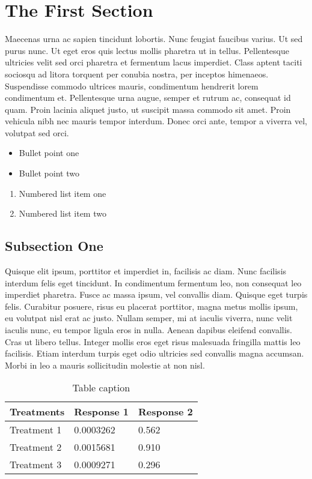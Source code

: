 \documentclass[preprint,12pt]{elsarticle}
\begin{document}
\linenumbers

\section{The First Section}
\label{S:1}

Maecenas urna ac sapien tincidunt lobortis. Nunc feugiat faucibus varius. Ut sed purus nunc. Ut eget eros quis lectus mollis pharetra ut in tellus. Pellentesque ultricies velit sed orci pharetra et fermentum lacus imperdiet. Class aptent taciti sociosqu ad litora torquent per conubia nostra, per inceptos himenaeos. Suspendisse commodo ultrices mauris, condimentum hendrerit lorem condimentum et. Pellentesque urna augue, semper et rutrum ac, consequat id quam. Proin lacinia aliquet justo, ut suscipit massa commodo sit amet. Proin vehicula nibh nec mauris tempor interdum. Donec orci ante, tempor a viverra vel, volutpat sed orci.

\begin{itemize}
\item Bullet point one
\item Bullet point two
\end{itemize}

\begin{enumerate}
\item Numbered list item one
\item Numbered list item two
\end{enumerate}

\subsection{Subsection One}

Quisque elit ipsum, porttitor et imperdiet in, facilisis ac diam. Nunc facilisis interdum felis eget tincidunt. In condimentum fermentum leo, non consequat leo imperdiet pharetra. Fusce ac massa ipsum, vel convallis diam. Quisque eget turpis felis. Curabitur posuere, risus eu placerat porttitor, magna metus mollis ipsum, eu volutpat nisl erat ac justo. Nullam semper, mi at iaculis viverra, nunc velit iaculis nunc, eu tempor ligula eros in nulla. Aenean dapibus eleifend convallis. Cras ut libero tellus. Integer mollis eros eget risus malesuada fringilla mattis leo facilisis. Etiam interdum turpis eget odio ultricies sed convallis magna accumsan. Morbi in leo a mauris sollicitudin molestie at non nisl.

\begin{table}[h]
\centering
\begin{tabular}{l l l}
\hline
\textbf{Treatments} & \textbf{Response 1} & \textbf{Response 2}\\
\hline
Treatment 1 & 0.0003262 & 0.562 \\
Treatment 2 & 0.0015681 & 0.910 \\
Treatment 3 & 0.0009271 & 0.296 \\
\hline
\end{tabular}
\caption{Table caption}
\end{table}
\end{document}

